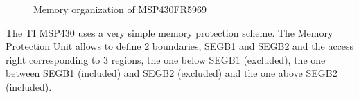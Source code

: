 \documentclass[11pt, oneside]{article}   	%
\begin{document}
\begin{figure}[htbp]
\caption{Memory organization of MSP430FR5969}
\label{fig:memorg}
\end{figure}

The TI MSP430 uses a very simple memory protection scheme. The Memory Protection Unit allows to define 2 boundaries, SEGB1 and SEGB2 and the access right corresponding to 3 regions, the one below SEGB1 (excluded), the one between SEGB1 (included) and SEGB2 (excluded) and the one above SEGB2 (included). 



\end{document}
